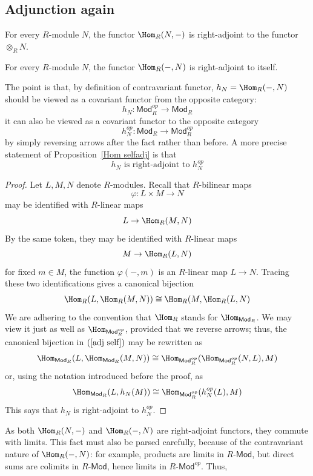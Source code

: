 \subsection{Adjunction again}
\begin{proposition}
For every $R$-module $N$, the functor $\Hom_R(N,-)$ is right-adjoint to the functor $\otimes_{R}N$.
\end{proposition}
\begin{proposition}\label{Hom selfadj}
For every $R$-module $N$, the functor $\Hom_R(-,N)$ is right-adjoint to itself.
\end{proposition}
The point is that, by definition of contravariant functor, $h_N=\Hom_R(-,N)$ should be viewed as a covariant functor from the opposite category:
\[h_N:\mathsf{Mod}_R^{op}\to \mathsf{Mod}_R\]
it can also be viewed as a covariant functor to the opposite category
\[h_N^{op}:\mathsf{Mod}_R\to \mathsf{Mod}_R^{op}\]
by simply reversing arrows after the fact rather than before. A more precise statement of Proposition~\ref{Hom selfadj} is that
\[h_N\text{ is right-adjoint to }h_N^{op}\]
\begin{proof}
Let $L,M,N$ denote $R$-modules. Recall that $R$-bilinear maps
\[\varphi:L\times M\to N\]
may be identified with $R$-linear maps
\[L\to\Hom_R(M,N)\]
By the same token, they may be identified with $R$-linear maps
\[M\to\Hom_R(L,N)\]
for fixed $m\in M$, the function $\varphi(-,m)$ is an $R$-linear map $L\to N$. Tracing these two identifications gives a canonical bijection
\begin{align}\label{adj self}
\Hom_R(L,\Hom_R(M,N))\cong\Hom_R(M,\Hom_R(L,N)
\end{align}
We are adhering to the convention that $\Hom_R$ stands for $\Hom_{\mathsf{Mod}_R}$. We may view it just as well as $\Hom_{\mathsf{Mod}_R^{op}}$, provided that we reverse arrows; thus, the canonical bijection in $(\ref{adj self})$ may be rewritten as
\[\Hom_{\mathsf{Mod}_R}(L,\Hom_{\mathsf{Mod}_R}(M,N))\cong\Hom_{\mathsf{Mod}_R^{op}}(\Hom_{\mathsf{Mod}_R^{op}}(N,L),M)\]
or, using the notation introduced before the proof, as
\[\Hom_{\mathsf{Mod}_R}(L,h_N(M))\cong\Hom_{\mathsf{Mod}_R^{op}}(h_N^{op}(L),M)\]
This says that $h_N$ is right-adjoint to $h_N^{op}$.
\end{proof}
As both $\Hom_R(N,-)$ and $\Hom_R(-,N)$ are right-adjoint functors, they commute with limits. This fact must also be parsed carefully, because of the contravariant nature of $\Hom_R(-,N)$: for example, products are limits in $R$-$\mathsf{Mod}$, but direct sums are colimits in $R$-$\mathsf{Mod}$, hence limits in $R$-$\mathsf{Mod}^{op}$. Thus,
